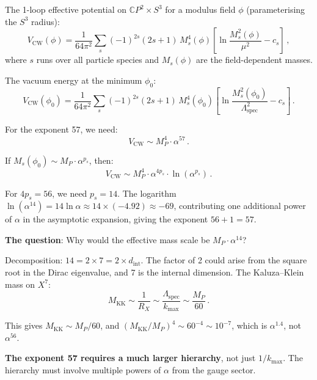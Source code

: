 \documentclass[11pt,a4paper]{article}
\newcommand{\CP}{\mathbb{C}P}
\begin{document}
The 1-loop effective potential on $\CP^2 \times S^3$ for a modulus field $\phi$ (parameterising the $S^3$ radius):
\begin{equation}
V_{\mathrm{CW}}(\phi) = \frac{1}{64\pi^2}\sum_s (-1)^{2s}(2s+1)\,M_s^4(\phi)\left[\ln\frac{M_s^2(\phi)}{\mu^2} - c_s\right]\,,
\end{equation}
where $s$ runs over all particle species and $M_s(\phi)$ are the field-dependent masses.

The vacuum energy at the minimum $\phi_0$:
\begin{equation}
V_{\mathrm{CW}}(\phi_0) = \frac{1}{64\pi^2}\sum_s (-1)^{2s}(2s+1)\,M_s^4(\phi_0)\left[\ln\frac{M_s^2(\phi_0)}{\Lambda_{\mathrm{spec}}^2} - c_s\right]\,.
\end{equation}

For the exponent 57, we need:
\begin{equation}
V_{\mathrm{CW}} \sim M_P^4 \cdot \alpha^{57}\,.
\end{equation}

If $M_s(\phi_0) \sim M_P \cdot \alpha^{p_s}$, then:
\begin{equation}
V_{\mathrm{CW}} \sim M_P^4 \cdot \alpha^{4p_s} \cdot \ln(\alpha^{p_s})\,.
\end{equation}

For $4p_s = 56$, we need $p_s = 14$. The logarithm $\ln(\alpha^{14}) = 14\ln\alpha \approx 14 \times (-4.92) \approx -69$, contributing one additional power of $\alpha$ in the asymptotic expansion, giving the exponent $56 + 1 = 57$.

\textbf{The question}: Why would the effective mass scale be $M_P \cdot \alpha^{14}$?

Decomposition: $14 = 2 \times 7 = 2 \times d_{\mathrm{int}}$. The factor of 2 could arise from the square root in the Dirac eigenvalue, and 7 is the internal dimension. The Kaluza--Klein mass on $X^7$:
\begin{equation}
M_{\mathrm{KK}} \sim \frac{1}{R_X} \sim \frac{\Lambda_{\mathrm{spec}}}{k_{\max}} \sim \frac{M_P}{60}\,.
\end{equation}

This gives $M_{\mathrm{KK}} \sim M_P/60$, and $(M_{\mathrm{KK}}/M_P)^4 \sim 60^{-4} \sim 10^{-7}$, which is $\alpha^{1.4}$, not $\alpha^{56}$.

\textbf{The exponent 57 requires a much larger hierarchy}, not just $1/k_{\max}$. The hierarchy must involve multiple powers of $\alpha$ from the gauge sector.
\end{document}
